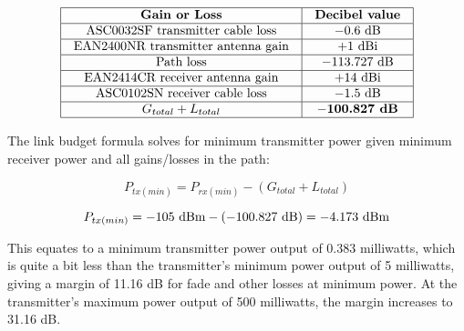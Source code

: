 $$\vbox{\offinterlineskip
\halign{\strut
\vrule \quad\hfil # \ \hfil & 
\vrule \quad\hfil # \ \hfil \vrule \cr
\noalign{\hrule}
%
{\bf Gain or Loss} & {\bf Decibel value} \cr
%
\noalign{\hrule}
%
ASC0032SF transmitter cable loss & $-0.6$ dB \cr
%
\noalign{\hrule}
%
EAN2400NR transmitter antenna gain & +1 dBi \cr
%
\noalign{\hrule}
%
Path loss & $-113.727$ dB \cr
%
\noalign{\hrule}
%
EAN2414CR receiver antenna gain & +14 dBi \cr
%
\noalign{\hrule}
%
ASC0102SN receiver cable loss & $-1.5$ dB \cr
%
\noalign{\hrule}
%
$G_{total} + L_{total}$ & {\bf $-$100.827 dB} \cr
%
\noalign{\hrule}
} %
}$$ %

The link budget formula solves for minimum transmitter power given minimum receiver power and all gains/losses in the path:

$$P_{tx(min)} = P_{rx(min)} - (G_{total} + L_{total})$$

$$P_{tx(min)} = -105 \hbox{ dBm} - (-100.827 \hbox{ dB}) = -4.173 \hbox{ dBm}$$

This equates to a minimum transmitter power output of 0.383 milliwatts, which is quite a bit less than the transmitter's minimum power output of 5 milliwatts, giving a margin of 11.16 dB for fade and other losses at minimum power.  At the transmitter's maximum power output of 500 milliwatts, the margin increases to 31.16 dB.




